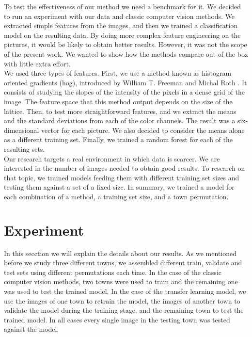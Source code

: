 To test the effectiveness of our method we need a benchmark for it. We decided to run an experiment with our data and classic computer vision methods. We extracted simple features from the images, and then we trained a classification model on the resulting data. By doing more complex feature engineering on the pictures, it would be likely to obtain better results. However, it was not the scope of the present work. We wanted to show how the methods compare out of the box with little extra effort.\\

We used three types of features. First, we use a method known as histogram oriented gradients (hog), introduced by William T. Freeman and Michal Roth \cite{MERL_TR94-03}. It consists of studying the slopes of the intensity of the pixels in a dense grid of the image. The feature space that this method output depends on the size of the lattice. Then, to test more straightforward features, and we extract the means and the standard deviations from each of the color channels. The result was a six-dimensional vector for each picture. We also decided to consider the means alone as a different training set. Finally, we trained a random forest for each of the resulting sets.\\

Our research targets a real environment in which data is scarcer. We are interested in the number of images needed to obtain good results. To research on that topic, we trained models feeding them with different training set sizes and testing them against a set of a fixed size. In summary, we trained a model for each combination of a method, a training set size, and a town permutation.\\

\section{Experiment}

In this secction we will explain the details about our results. As we mentioned before we study three different towns, we assembled different train, validate and test sets using different permutations each time. In the case of the classic computer vision methods, two towns were used to train and the remaining one was used to test the trained model. In the case of the transfer learning model, we use the images of one town to retrain the model, the images of another town to validate the model during the training stage, and the remaining town to test the trained model. In all cases every single image in the testing town was tested against the model.

